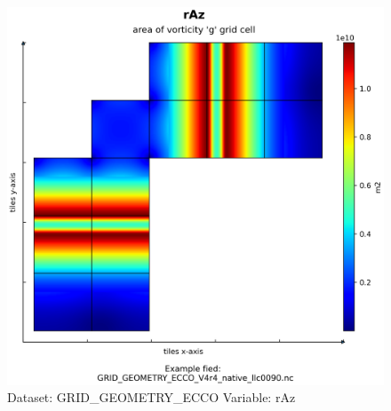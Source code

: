 \begin{figure}[H]
\centering
\includegraphics[width=\textwidth]{../images/plots/native_plots_coords/Geometry_Parameters_for_the_Lat-Lon-Cap_90_(llc90)_Native_Model_Grid_(Version_4_Release_4)/rAz.png}
\caption{Dataset: GRID\_GEOMETRY\_ECCO Variable: rAz}
\label{tab:table-GRID_GEOMETRY_ECCO_rAz-Plot}
\end{figure}
\pagebreak
